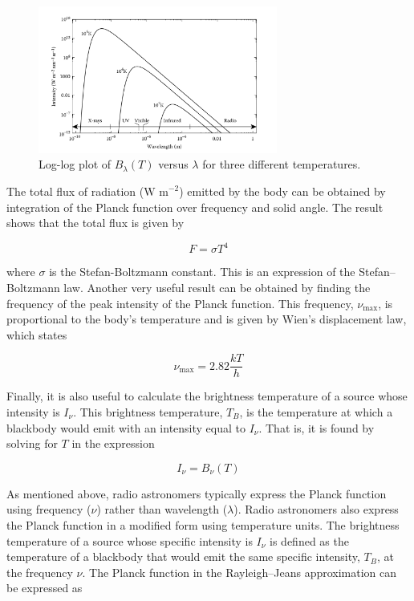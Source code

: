 \begin{figure}[H]
	\centering
	\includegraphics[width=0.7\textwidth]{Images/B_lambda_plot.png}
	\caption{Log-log plot of $B_{\lambda}(T)$ versus $\lambda$ for three different temperatures.}
	\label{fig:planckfunctionlambda}
\end{figure}

The total flux of radiation (\(\text{W m}^{-2}\)) emitted by the body can be obtained by integration of the Planck function over frequency and solid angle. The result shows that the total flux is given by

\begin{equation}
	F = \sigma T^4
	\label{eq:stefanboltzmannlaw}
\end{equation}

where \(\sigma\) is the Stefan-Boltzmann constant. This is an expression of the Stefan–Boltzmann law. Another very useful result can be obtained by finding the frequency of the peak intensity of the Planck function. This frequency, \(\nu_\text{max}\), is proportional to the body’s temperature and is given by Wien’s displacement law, which states

\[
\nu_\text{max} = 2.82 \frac{kT}{h}
\]

Finally, it is also useful to calculate the brightness temperature of a source whose intensity is \(I_\nu\). This brightness temperature, \(T_B\), is the temperature at which a blackbody would emit with an intensity equal to \(I_\nu\). That is, it is found by solving for \(T\) in the expression

\[
I_\nu = B_\nu(T)
\]

As mentioned above, radio astronomers typically express the Planck function using frequency (\(\nu\)) rather than wavelength (\(\lambda\)). Radio astronomers also express the Planck function in a modified form using temperature units. The brightness temperature of a source whose specific intensity is \(I_\nu\) is defined as the temperature of a blackbody that would emit the same specific intensity, \(T_B\), at the frequency \(\nu\). The Planck function in the Rayleigh–Jeans approximation can be expressed as

